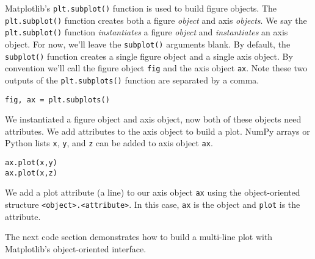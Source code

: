 \documentclass{book}
\newcommand{\passthrough}[1]{#1}
\begin{document}
    
        Matplotlib's \passthrough{\lstinline!plt.subplot()!} function is used to
build figure objects. The \passthrough{\lstinline!plt.subplot()!}
function creates both a figure \emph{object} and axis \emph{objects}. We
say the \passthrough{\lstinline!plt.subplot()!} function
\emph{instantiates} a figure \emph{object} and \emph{instantiates} an
axis object. For now, we'll leave the
\passthrough{\lstinline!subplot()!} arguments blank. By default, the
\passthrough{\lstinline!subplot()!} function creates a single figure
object and a single axis object. By convention we'll call the figure
object \passthrough{\lstinline!fig!} and the axis object
\passthrough{\lstinline!ax!}. Note these two outputs of the
\passthrough{\lstinline!plt.subplots()!} function are separated by a
comma.

\begin{lstlisting}
fig, ax = plt.subplots()
\end{lstlisting}

We instantiated a figure object and axis object, now both of these
objects need attributes. We add attributes to the axis object to build a
plot. NumPy arrays or Python lists \passthrough{\lstinline!x!},
\passthrough{\lstinline!y!}, and \passthrough{\lstinline!z!} can be
added to axis object \passthrough{\lstinline!ax!}.

\begin{lstlisting}
ax.plot(x,y)
ax.plot(x,z)
\end{lstlisting}

We add a plot attribute (a line) to our axis object
\passthrough{\lstinline!ax!} using the object-oriented structure
\passthrough{\lstinline!<object>.<attribute>!}. In this case,
\passthrough{\lstinline!ax!} is the object and
\passthrough{\lstinline!plot!} is the attribute.

The next code section demonstrates how to build a multi-line plot with
Matplotlib's object-oriented interface.
    
\end{document}
